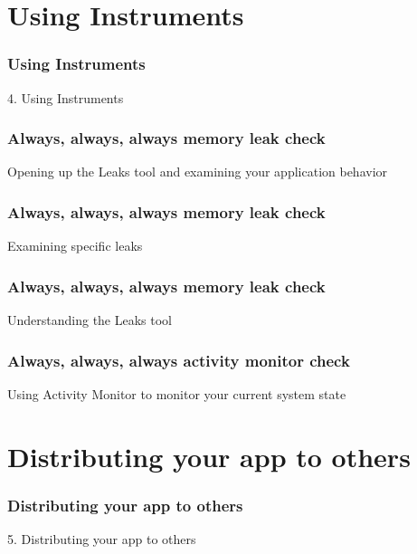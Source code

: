 \documentclass[10pt]{beamer}
\begin{document}
    

   
  

  
    
\section{Using Instruments}
\begin{frame}[fragile]
  \frametitle{Using Instruments}
  4. Using Instruments
\end{frame}


    
\begin{frame}[fragile]
  \frametitle{Always, always, always memory leak check}
  Opening up the Leaks tool and examining your application behavior

\end{frame}

\begin{frame}[fragile]
  \frametitle{Always, always, always memory leak check}
  Examining specific leaks

\end{frame}

\begin{frame}[fragile]
  \frametitle{Always, always, always memory leak check}
  Understanding the Leaks tool

\end{frame}

    
\begin{frame}[fragile]
  \frametitle{Always, always, always activity monitor check}
  Using Activity Monitor to monitor your current system state

\end{frame}

    

   
  

  
    
\section{Distributing your app to others}
\begin{frame}[fragile]
  \frametitle{Distributing your app to others}
  5. Distributing your app to others
\end{frame}
\end{document}

